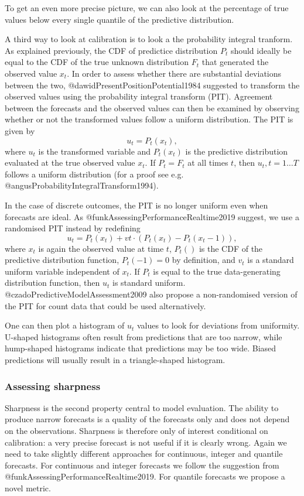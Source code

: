 \documentclass[article]{jss}
\begin{document}
To get an even more precise picture, we can also look at the percentage of true values below every single quantile of the predictive distribution.


A third way to look at calibration is to look a the probability integral tranform. As explained previously, the CDF of predictice distribution $P_t$ should ideally be equal to the CDF of the true unknown distribution $F_t$ that generated the observed value $x_t$. In order to assess whether there are substantial deviations between the two, @dawidPresentPositionPotential1984 suggested to transform the observed values using the probability integral transform (PIT). Agreement between the forecasts and the observed values can then be examined by observing whether or not the transformed values follow a uniform distribution. The PIT is given by 
$$u_t = P_t (x_t),$$
where $u_t$ is the transformed variable and $P_t(x_t)$ is the predictive distribution evaluated at the true observed value $x_t$. If $P_t = F_t$ at all times $t$, then $u_t, t = 1 \dots T$ follows a uniform distribution (for a proof see e.g. @angusProbabilityIntegralTransform1994). 

In the case of discrete outcomes, the PIT is no longer uniform even when forecasts are ideal. As @funkAssessingPerformanceRealtime2019 suggest, we use a randomised PIT instead by redefining 
$$u_t = P_t(x_t) + vt \cdot (P_t(x_t) - P_t(x_t - 1) ),$$
where $x_t$ is again the observed value at time $t$, $P_t()$ is the CDF of the predictive distribution function, $P_t (-1) = 0$ by definition, and $v_t$ is a standard uniform variable independent of $x_t$. If $P_t$ is equal to the true data-generating distribution function, then $u_t$ is standard uniform. @czadoPredictiveModelAssessment2009 also propose a non-randomised version of the PIT for count data that could be used alternatively. 

One can then plot a histogram of $u_t$ values to look for deviations from uniformity. U-shaped histograms often result from predictions that are too narrow, while hump-shaped histograms indicate that predictions may be too wide. Biased predictions will usually result in a triangle-shaped histogram. 

\subsubsection{Assessing sharpness}

Sharpness is the second property central to model evaluation. The ability to produce narrow forecasts is a quality of the forecasts only and does not depend on the observations. Sharpness is therefore only of interest conditional on calibration: a very precise forecast is not useful if it is clearly wrong. Again we need to take slightly different approaches for continuous, integer and quantile forecasts. For continuous and integer forecasts we follow the suggestion from @funkAssessingPerformanceRealtime2019. For quantile forecasts we propose a novel metric. 
\end{document}
